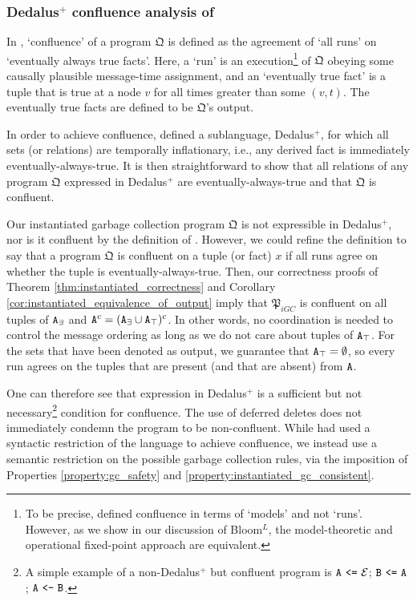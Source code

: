 \subsubsection{Dedalus$^+$ confluence analysis of \cite{marczak2012confluence}}
In \cite{marczak2012confluence}, `confluence' of a program $\mathfrak{Q}$ is defined as the agreement of `all runs' on `eventually always true facts'.
Here, a `run' is an execution\footnote{
	To be precise, \cite{marczak2012confluence} defined confluence in terms of `models' and not `runs'.
    However, as we show in our discussion of Bloom$^L$, the model-theoretic and operational fixed-point approach are equivalent.
} of $\mathfrak{Q}$ obeying some causally plausible message-time assignment, and an `eventually true fact' is a tuple that is true at a node $v$ for all times greater than some $(v,t)$.
The eventually true facts are defined to be $\mathfrak{Q}$'s output.

In order to achieve confluence, \cite{marczak2012confluence} defined a sublanguage, Dedalus$^+$, for which all sets (or relations) are temporally inflationary, i.e., any derived fact is immediately eventually-always-true.
It is then straightforward to show that all relations of any program $\mathfrak{Q}$ expressed in Dedalus$^+$ are eventually-always-true and that $\mathfrak{Q}$ is confluent.

Our instantiated garbage collection program $\mathfrak{Q}$ is not expressible in Dedalus$^+$, nor is it confluent by the definition of \cite{marczak2012confluence}.
However, we could refine the definition to say that a program $\mathfrak{Q}$ is confluent on a tuple (or fact) $x$ if all runs agree on whether the tuple is eventually-always-true.
Then, our correctness proofs of Theorem \ref{thm:instantiated_correctness} and Corollary \ref{cor:instantiated_equivalence_of_output} imply that $\mathfrak{P}_{iGC}$ is confluent on all tuples of $\tt{A}_\exists$ and $\tt{A}^c = (\tt{A}_\exists \cup \tt{A}_\top)^c$.
In other words, no coordination is needed to control the message ordering as long as we do not care about tuples of $\tt{A}_\top$.
For the sets that have been denoted as output, we guarantee that $\tt{A}_\top = \emptyset$, so every run agrees on the tuples that are present (and that are absent) from $\tt{A}$.

One can therefore see that expression in Dedalus$^+$ is a sufficient but not necessary\footnote{
	A simple example of a non-Dedalus$^+$ but confluent program is $\tt{A} ~\tt{<=}~ \mathcal{E}$; $\tt{B} ~\tt{<=}~ \tt{A}$; $\tt{A} ~\tt{<-}~ \tt{B}$.
} condition for confluence.
The use of deferred deletes does not immediately condemn the program to be non-confluent.
While \cite{marczak2012confluence} had used a syntactic restriction of the language to achieve confluence, we instead use a semantic restriction on the possible garbage collection rules, via the imposition of Properties \ref{property:gc_safety} and \ref{property:instantiated_gc_consistent}.

